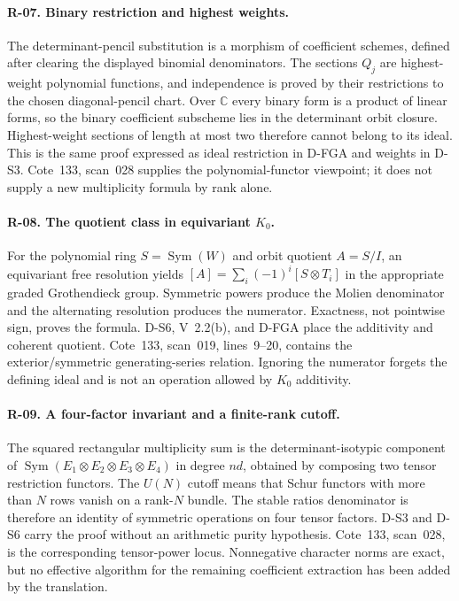 \paragraph{R-07. Binary restriction and highest weights.}
The determinant-pencil substitution is a morphism of coefficient schemes, defined after clearing the displayed binomial denominators. The sections $Q_j$ are highest-weight polynomial functions, and independence is proved by their restrictions to the chosen diagonal-pencil chart. Over $\mathbb C$ every binary form is a product of linear forms, so the binary coefficient subscheme lies in the determinant orbit closure. Highest-weight sections of length at most two therefore cannot belong to its ideal. This is the same proof expressed as ideal restriction in D-FGA and weights in D-S3. Cote~133, scan~028 supplies the polynomial-functor viewpoint; it does not supply a new multiplicity formula by rank alone.

\paragraph{R-08. The quotient class in equivariant $K_0$.}
For the polynomial ring $S=\operatorname{Sym}(W)$ and orbit quotient $A=S/I$, an equivariant free resolution yields $[A]=\sum_i(-1)^i[S\otimes T_i]$ in the appropriate graded Grothendieck group. Symmetric powers produce the Molien denominator and the alternating resolution produces the numerator. Exactness, not pointwise sign, proves the formula. D-S6, V~2.2(b), and D-FGA place the additivity and coherent quotient. Cote~133, scan~019, lines~9--20, contains the exterior/symmetric generating-series relation. Ignoring the numerator forgets the defining ideal and is not an operation allowed by $K_0$ additivity.

\paragraph{R-09. A four-factor invariant and a finite-rank cutoff.}
The squared rectangular multiplicity sum is the determinant-isotypic component of $\operatorname{Sym}(E_1\otimes E_2\otimes E_3\otimes E_4)$ in degree $nd$, obtained by composing two tensor restriction functors. The $U(N)$ cutoff means that Schur functors with more than $N$ rows vanish on a rank-$N$ bundle. The stable ratios denominator is therefore an identity of symmetric operations on four tensor factors. D-S3 and D-S6 carry the proof without an arithmetic purity hypothesis. Cote~133, scan~028, is the corresponding tensor-power locus. Nonnegative character norms are exact, but no effective algorithm for the remaining coefficient extraction has been added by the translation.

